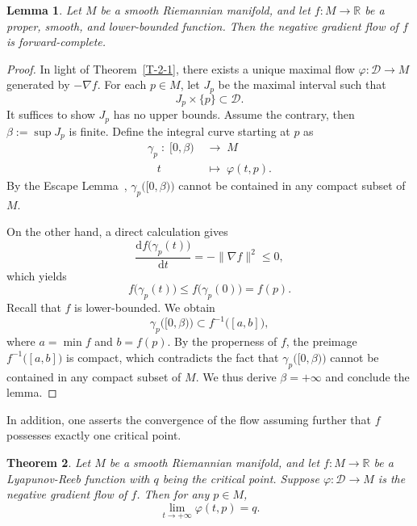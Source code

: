\documentclass[11pt,letterpaper]{amsart}
\theoremstyle{plain}
\newtheorem{theorem}{Theorem}[section]
\newtheorem{lemma}[theorem]{Lemma}
\theoremstyle{definition}
\theoremstyle{remark}
\numberwithin{equation}{section}
\begin{document}
\begin{lemma}\label{L-2-2}
Let $M$ be a smooth Riemannian manifold, and let $f:M\to\mathbb R$ be a proper, smooth, and lower-bounded function. Then the negative gradient flow of $f$ is forward-complete.
\end{lemma}
\begin{proof}
In light of Theorem~\ref{T-2-1}, there exists a unique maximal flow $\varphi:\mathcal D\to M$ generated by $-\nabla f$. For each $p\in M$, let $J_p$ be the maximal interval such that
\[
J_p\times\{p\}\subset \mathcal D.
\]
It suffices to show $J_p$ has no upper bounds. Assume the contrary, then $\beta:=\sup J_p$ is finite. Define the integral curve starting at $p$ as
\[
\begin{aligned}
\gamma_p\;:\;[0,\beta)\;&\longrightarrow\; M\\
\;\;\;t\quad\;&\longmapsto\;\varphi(t,p).
\end{aligned}
\]
By the Escape Lemma~\cite[Lemma 9.19]{Lee-2018},  $\gamma_p\big([0,\beta)\big)$ cannot be contained in any compact subset of $M$.

On the other hand, a direct calculation gives
\[
\frac{\mathrm{d}f\big(\gamma_p(t)\big)}{\mathrm{d}t}
=-\| \nabla f \|^2\leq 0,
\]
which yields
\[
f\big(\gamma_p(t)\big)\leq f\big(\gamma_p(0)\big)=f(p).
\]
Recall that $f$ is lower-bounded. We obtain
\[
\gamma_p\big([0,\beta)\big)\subset f^{-1}\big([a,b]\big),
\]
where $a=\min f$ and $b=f(p)$. By the properness of $f$, the preimage $f^{-1}\big([a,b]\big)$ is compact, which contradicts the fact that $\gamma_p\big([0,\beta)\big)$ cannot be contained in any compact subset of $M$. We thus derive $\beta=+\infty$ and conclude the lemma.
\end{proof}

In addition, one asserts the convergence of the flow assuming further that $f$ possesses exactly one critical point.
\begin{theorem}\label{T-2-3}
Let $M$ be a smooth Riemannian manifold, and let
$f: M\to\mathbb R$ be a Lyapunov-Reeb function with $q$ being the critical point. Suppose $\varphi:\mathcal D\to M$ is the negative gradient flow of $f$. Then for any $p\in M$,
\[
\lim_{t\to+\infty}\varphi(t,p)=q.
\]
\end{theorem}
\end{document}
